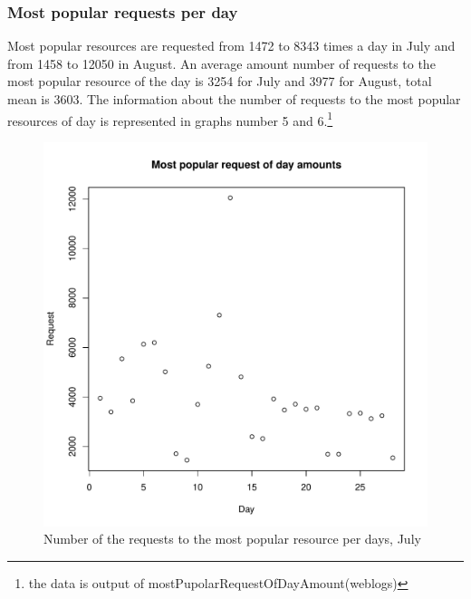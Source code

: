 \documentclass[english]{article}
\begin{document}
\subsubsection{Most popular requests per day}
Most popular resources are requested from 1472 to 8343 times a day in July and from 1458 to 12050 in August. An average amount number of requests to the most popular resource of the day is  3254 for July and 3977 for August, total mean is 3603. The information about the number of requests to the most popular resources of day is represented in graphs number 5 and 6.\footnote{the data is output of mostPupolarRequestOfDayAmount(weblogs)}
\begin{figure}[H]
\centerline{\includegraphics{Weblogs/Jul/MostPopularRequestOfDayAmounts.pdf}}
\caption{Number of the requests to the most popular resource per days, July}
\end{figure}
\end{document}
